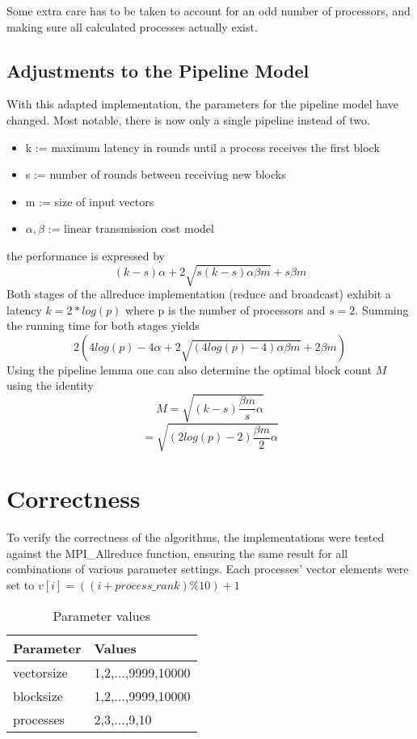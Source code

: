 \documentclass[twoside,twocolumn,hidelinks]{article}
\begin{document}
Some extra care has to be taken to account for an odd number of processors, and making sure all calculated processes actually exist.

\subsection{Adjustments to the Pipeline Model}
With this adapted implementation, the parameters for the pipeline model have changed. Most notable, there is now only a single pipeline instead of two.
\begin{itemize}
      \item k := maximum latency in rounds until a process receives the first block
      \item s := number of rounds between receiving new blocks
      \item m := size of input vectors
      \item $\alpha,\beta$ := linear transmission cost model
\end{itemize}
the performance is expressed by
\begin{equation}
      (k-s)\alpha + 2\sqrt{s(k-s)\alpha\beta m} + s\beta m
\end{equation}
Both stages of the allreduce implementation (reduce and broadcast) exhibit a latency $k=2*log(p)$ where p is the number of processors and $s=2$. Summing the running time for both stages yields
\begin{equation}
      2(4log(p)-4\alpha + 2\sqrt{(4log(p)-4)\alpha\beta m} + 2\beta m)
\end{equation}
Using the pipeline lemma one can also determine the optimal block count $M$ using the identity 
\begin{equation}
      M = \sqrt{(k-s)\frac{\beta m}{s}\alpha}
\end{equation}
\begin{equation}
      = \sqrt{(2log(p)-2)\frac{\beta m}{2}\alpha}
\end{equation}

\section{Correctness}
To verify the correctness of the algorithms, the implementations were tested against the MPI\_Allreduce function, ensuring the same result for all combinations of various parameter settings. Each processes' vector elements were set to $v[i] = ((i + process\_rank) \% 10) + 1$

\begin{table}[h]
      \centering
      \begin{tabular}{ll}
            \toprule
            Parameter & Values \\
            \midrule
            vectorsize   & 1,2,...,9999,10000 \\
            blocksize    & 1,2,...,9999,10000  \\
            processes    & 2,3,...,9,10  \\
            \bottomrule
      \end{tabular}
      \caption{Parameter values}
\end{table}
  
\printbibliography

\end{document}
